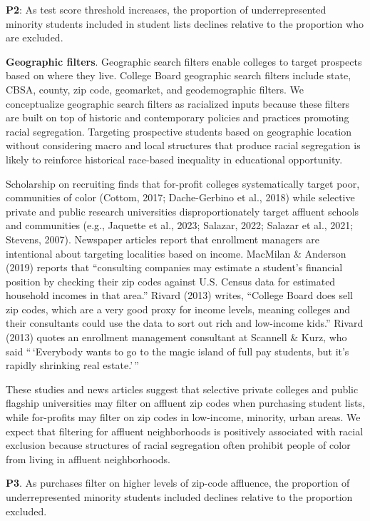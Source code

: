 \documentclass[
  12pt,
]{article}
\begin{document}
\textbf{P2}: As test score threshold increases, the proportion of underrepresented minority students included in student lists declines relative to the proportion who are excluded.

\textbf{Geographic filters}. Geographic search filters enable colleges to target prospects based on where they live. College Board geographic search filters include state, CBSA, county, zip code, geomarket, and geodemographic filters. We conceptualize geographic search filters as racialized inputs because these filters are built on top of historic and contemporary policies and practices promoting racial segregation. Targeting prospective students based on geographic location without considering macro and local structures that produce racial segregation is likely to reinforce historical race-based inequality in educational opportunity.

Scholarship on recruiting finds that for-profit colleges systematically target poor, communities of color (Cottom, 2017; Dache-Gerbino et al., 2018) while selective private and public research universities disproportionately target affluent schools and communities (e.g., Jaquette et al., 2023; Salazar, 2022; Salazar et al., 2021; Stevens, 2007). Newspaper articles report that enrollment managers are intentional about targeting localities based on income. MacMilan \& Anderson (2019) reports that ``consulting companies may estimate a student's financial position by checking their zip codes against U.S. Census data for estimated household incomes in that area.'' Rivard (2013) writes, ``College Board does sell zip codes, which are a very good proxy for income levels, meaning colleges and their consultants could use the data to sort out rich and low-income kids.'' Rivard (2013) quotes an enrollment management consultant at Scannell \& Kurz, who said ``\,`Everybody wants to go to the magic island of full pay students, but it's rapidly shrinking real estate.'\,''

These studies and news articles suggest that selective private colleges and public flagship universities may filter on affluent zip codes when purchasing student lists, while for-profits may filter on zip codes in low-income, minority, urban areas. We expect that filtering for affluent neighborhoods is positively associated with racial exclusion because structures of racial segregation often prohibit people of color from living in affluent neighborhoods.

\textbf{P3}. As purchases filter on higher levels of zip-code affluence, the proportion of underrepresented minority students included declines relative to the proportion excluded.
\end{document}
